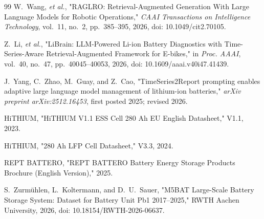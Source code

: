 \begin{thebibliography}{99}
W.~Wang, \emph{et al.},
"RAGLRO: Retrieval-Augmented Generation With Large Language Models for Robotic Operations,"
\emph{CAAI Transactions on Intelligence Technology}, vol.~11, no.~2, pp.~385--395, 2026,
doi: 10.1049/cit2.70105.

Z.~Li, \emph{et al.},
"LiBrain: LLM-Powered Li-ion Battery Diagnostics with Time-Series-Aware Retrieval-Augmented Framework for E-bikes,"
in \emph{Proc. AAAI}, vol.~40, no.~47, pp.~40045--40053, 2026,
doi: 10.1609/aaai.v40i47.41439.

J.~Yang, C.~Zhao, M.~Guay, and Z.~Cao,
"TimeSeries2Report prompting enables adaptive large language model management of lithium-ion batteries,"
\emph{arXiv preprint arXiv:2512.16453}, first posted 2025; revised 2026.

HiTHIUM, "HiTHIUM V1.1 ESS Cell 280 Ah EU English Datasheet," V1.1, 2023.

HiTHIUM, "280 Ah LFP Cell Datasheet," V3.3, 2024.

REPT BATTERO, "REPT BATTERO Battery Energy Storage Products Brochure (English Version)," 2025.

S.~Zurm\"uhlen, L.~Koltermann, and D.~U.~Sauer,
"M5BAT Large-Scale Battery Storage System: Dataset for Battery Unit Pb1 2017--2025,"
RWTH Aachen University, 2026,
doi: 10.18154/RWTH-2026-06637.

\end{thebibliography}
